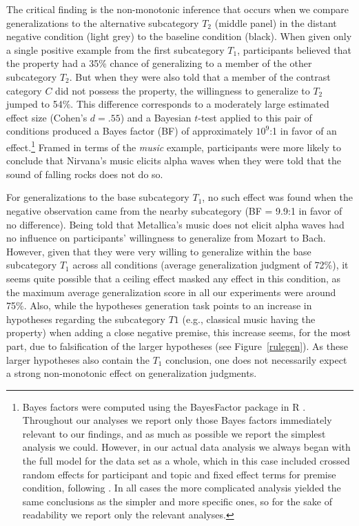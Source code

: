 \documentclass[authoryear,11pt]{elsarticle}
\begin{document}
The critical finding is the non-monotonic inference that occurs when we compare generalizations to the alternative subcategory $T_2$ (middle panel) in the {\sc distant negative} condition (light grey) to the {\sc baseline} condition (black). When given only a single positive example from the first subcategory $T_1$, participants believed that the property had a 35\% chance of generalizing to a member of the other subcategory $T_2$. But when they were also told that a member of the contrast category $C$ did not possess the property, the willingness to generalize to $T_2$ jumped to 54\%. This difference corresponds to a moderately large estimated effect size (Cohen's $d=.55$) and a Bayesian $t$-test applied to this pair of conditions produced a Bayes factor (BF) of approximately $10^9$:1 in favor of an effect.\footnote{Bayes factors were computed using the BayesFactor package in R \citep{BayesFactorManual}. Throughout our analyses we report only those Bayes factors immediately relevant to our findings, and as much as possible we report the simplest analysis we could. However, in our actual data analysis we always began with the full model for the data set as a whole, which in this case included crossed random effects for participant and topic and fixed effect terms for premise condition, following \citet{Baayenetal2008}. In all cases the more complicated analysis yielded the same conclusions as the simpler and more specific ones, so for the sake of readability we report only the relevant analyses.} Framed in terms of the {\it music} example, participants were more likely to conclude that Nirvana's music elicits alpha waves when they were told that the sound of falling rocks does not do so.

For generalizations to the base subcategory $T_1$, no such effect was found when the negative observation came from the nearby subcategory (BF = 9.9:1 in favor of no difference). Being told that Metallica's music does not elicit alpha waves had no influence on participants' willingness to generalize from Mozart to Bach. However, given that they were very willing to generalize within the base subcategory $T_1$ across all conditions (average generalization judgment of 72\%), it seems quite possible that a ceiling effect masked any effect in this condition, as the maximum average generalization score in all our experiments were around 75\%. Also, while the hypotheses generation task points to an increase in hypotheses regarding the subcategory $T1$ (e.g., classical music having the property) when adding a close negative premise, this increase seems, for the most part, due to falsification of the larger hypotheses (see Figure~\ref{rulegen}). As these larger hypotheses also contain the $T_1$ conclusion, one does not necessarily expect a strong non-monotonic effect on generalization judgments.
\end{document}
